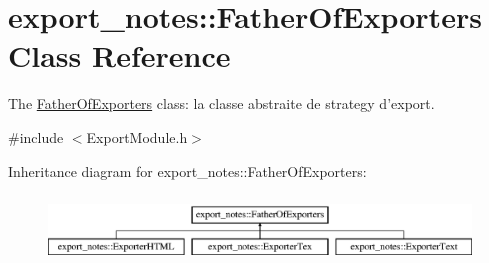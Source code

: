 \hypertarget{classexport__notes_1_1_father_of_exporters}{\section{export\-\_\-notes\-:\-:Father\-Of\-Exporters Class Reference}
\label{classexport__notes_1_1_father_of_exporters}
}


The \hyperlink{classexport__notes_1_1_father_of_exporters}{Father\-Of\-Exporters} class\-: la classe abstraite de strategy d'export.  




{\ttfamily \#include $<$Export\-Module.\-h$>$}

Inheritance diagram for export\-\_\-notes\-:\-:Father\-Of\-Exporters\-:\begin{figure}[H]
\begin{center}
\leavevmode
\includegraphics[height=1.839080cm]{classexport__notes_1_1_father_of_exporters}
\end{center}
\end{figure}
